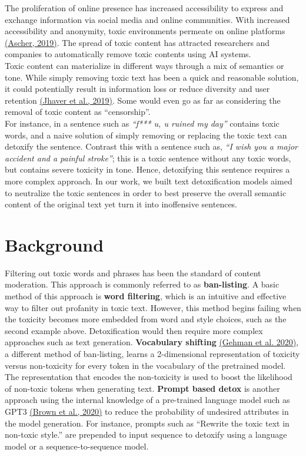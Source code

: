 \documentclass[11pt]{article}
\begin{document}
The proliferation of online presence has increased accessibility to express and exchange information via social media and online communities. With increased accessibility and anonymity, toxic environments permeate on online platforms \hyperref[sec:Ascher]{(Ascher, 2019)}. The spread of toxic content has attracted researchers and companies to automatically remove toxic contents using AI systems. \\
Toxic content can materialize in different ways through a mix of semantics or tone. While simply removing toxic text has been a quick and reasonable solution, it could potentially result in information loss or reduce diversity and user retention \hyperref[sec:Jhaver]{(Jhaver et al., 2019)}. Some would even go as far as considering the removal of toxic content as “censorship”. \\
For instance, in a sentence such as \textit{“f*** u, u ruined my day”} contains toxic words, and a naive solution of simply removing or replacing the toxic text can detoxify the sentence.  Contrast this with a sentence such as, \textit{“I wish you a major accident and a painful stroke”}; this is a toxic sentence without any toxic words, but contains severe toxicity in tone. Hence, detoxifying this sentence requires a more complex approach.  In our work, we built text detoxification models aimed to neutralize the toxic sentences in order to best preserve the overall semantic content of the original text yet turn it into inoffensive sentences.

\section{Background}

Filtering out toxic words and phrases has been the standard of content moderation. This approach is commonly referred to as \textbf{ban-listing}. A basic method of this approach is \textbf{word filtering}, which is an intuitive and effective way to filter out profanity in toxic text. However, this method begins failing when the toxicity becomes more embedded from word and style choices, such as the second example above. Detoxification would then require more complex approaches such as text generation. \textbf{Vocabulary shifting} \hyperref[sec:Gehman]{(Gehman et al. 2020)}, a different method of ban-listing, learns a 2-dimensional representation of toxicity versus non-toxicity for every token in the vocabulary of the pretrained model. The representation that encodes the non-toxicity is used to boost the likelihood of non-toxic tokens when generating text. \textbf{Prompt based detox} is another approach using the internal knowledge of a pre-trained language model such as GPT3 \hyperref[sec:Brown]{(Brown et al., 2020)} to reduce the probability of undesired attributes in the model generation. For instance, prompts such as “Rewrite the toxic text in non-toxic style.” are prepended to input sequence to detoxify using a language model or a sequence-to-sequence model.
\end{document}
